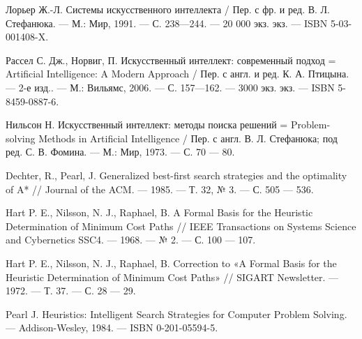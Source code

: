\begin{thebibliography}{99}








Лорьер Ж.-Л. Системы искусственного интеллекта / Пер. с фр. и ред. В. Л. Стефанюка. — М.: Мир, 1991. — С. 238—244. — 20 000 экз. экз. — ISBN 5-03-001408-X.


Рассел С. Дж., Норвиг, П. Искусственный интеллект: современный подход = Artificial Intelligence: A Modern Approach / Пер. с англ. и ред. К. А. Птицына. — 2-е изд.. — М.: Вильямс, 2006. — С. 157—162. — 3000 экз. экз. — ISBN 5-8459-0887-6.


Нильсон Н. Искусственный интеллект: методы поиска решений = Problem-solving Methods in Artificial Intelligence / Пер. с англ. В. Л. Стефанюка; под ред. С. В. Фомина. — М.: Мир, 1973. — С. 70 — 80.



Dechter, R., Pearl, J. Generalized best-first search strategies and the optimality of A* // Journal of the ACM. — 1985. — Т. 32, № 3. — С. 505 — 536.



Hart P. E., Nilsson, N. J., Raphael, B. A Formal Basis for the Heuristic Determination of Minimum Cost Paths // IEEE Transactions on Systems Science and Cybernetics SSC4. — 1968. — № 2. — С. 100 — 107.



Hart P. E., Nilsson, N. J., Raphael, B. Correction to «A Formal Basis for the Heuristic Determination of Minimum Cost Paths» // SIGART Newsletter. — 1972. — Т. 37. — С. 28 — 29.



Pearl J. Heuristics: Intelligent Search Strategies for Computer Problem Solving. — Addison-Wesley, 1984. — ISBN 0-201-05594-5.

\end{thebibliography}
\pagebreak
